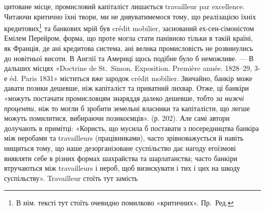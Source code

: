 цитоване місце, промисловий капіталіст лишається travailleur par excellence. Читаючи
критично їхні твори, ми не дивуватимемося тому, що реалізацією їхніх кредитових\footnote*{
В нім. тексті тут стоїть очевидно помилково «критичних». Пр.~Ред.
}
та банкових мрій був crédit mobilier, заснований ех-сен-сімоністом Емілем
Перейром, форма, що проте могла стати панівною тільки в такій країні, як
Франція, де ані кредитова система, ані велика промисловість не розвинулись
до новітньої висоти. В Англії та Америці щось подібне було б неможливе. —
В дальших місцях «Doctrine de St.~Simon. Exposition. Première année. 1828--29,
3-е éd. Paris 1831» міститься вже зародок crédit mobilier. Звичайно,
банкір може давати позики дешевше, ніж капіталіст та приватний лихвар.
Отже, ці банкіри «можуть постачати промисловцям знаряддя далеко дешевше,
тобто \emph{за нижчі проценти}, ніж то могли б зробити земельні власники
та капіталісти, що легше можуть помилитися, вибираючи позикоємців».
(р. 202). Але самі автори долучають в примітці: «Користь, що мусила б поставати
з посередництва банкіра між неробами та travailleurs (працівниками),
часто зрівноважується й навіть нищиться тому, що наше дезорганізоване суспільство
дає нагоду егоїзмові виявляти себе в різних формах шахрайства та
шарлатанства; часто банкіри втручаються між travailleurs і нероб, щоб визискувати
і тих і цих на шкоду суспільству». Travailleur стоїть тут замість
\parbreak{}  %
